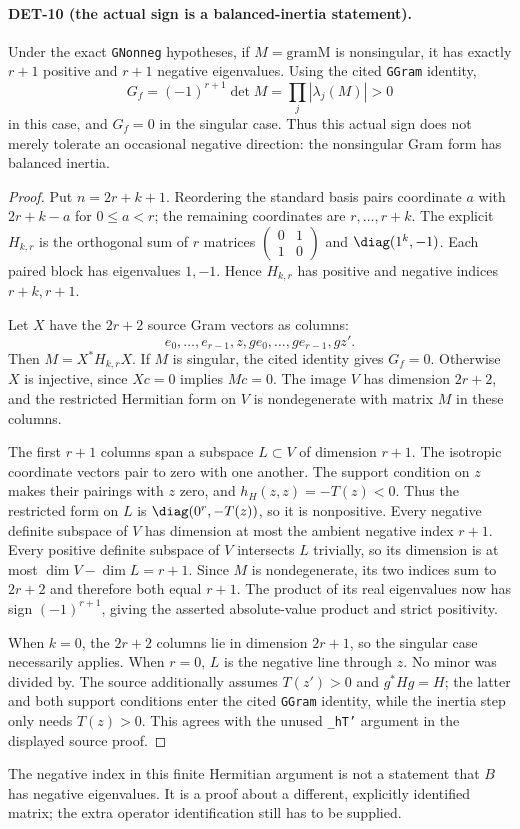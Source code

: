 \paragraph{DET-10 (the actual sign is a balanced-inertia statement).}
Under the exact \texttt{GNonneg} hypotheses, if $M=\mathrm{gramM}$ is nonsingular, it has exactly $r+1$ positive and $r+1$ negative eigenvalues. Using the cited \texttt{GGram} identity,
\[
 G_f=(-1)^{r+1}\det M=\prod_j|\lambda_j(M)|>0
\]
in this case, and $G_f=0$ in the singular case. Thus this actual sign does not merely tolerate an occasional negative direction: the nonsingular Gram form has balanced inertia.
\begin{proof}
Put $n=2r+k+1$. Reordering the standard basis pairs coordinate $a$ with $2r+k-a$ for $0\le a<r$; the remaining coordinates are $r,\ldots,r+k$. The explicit $H_{k,r}$ is the orthogonal sum of $r$ matrices $\left(\begin{smallmatrix}0&1\\1&0\end{smallmatrix}\right)$ and $\diag(1^k,-1)$. Each paired block has eigenvalues $1,-1$. Hence $H_{k,r}$ has positive and negative indices $r+k,r+1$.

Let $X$ have the $2r+2$ source Gram vectors as columns:
\[e_0,\ldots,e_{r-1},z,ge_0,\ldots,ge_{r-1},gz'.\]
Then $M=X^*H_{k,r}X$. If $M$ is singular, the cited identity gives $G_f=0$. Otherwise $X$ is injective, since $Xc=0$ implies $Mc=0$. The image $V$ has dimension $2r+2$, and the restricted Hermitian form on $V$ is nondegenerate with matrix $M$ in these columns.

The first $r+1$ columns span a subspace $L\subset V$ of dimension $r+1$. The isotropic coordinate vectors pair to zero with one another. The support condition on $z$ makes their pairings with $z$ zero, and $h_H(z,z)=-T(z)<0$. Thus the restricted form on $L$ is $\diag(0^r,-T(z))$, so it is nonpositive. Every negative definite subspace of $V$ has dimension at most the ambient negative index $r+1$. Every positive definite subspace of $V$ intersects $L$ trivially, so its dimension is at most $\dim V-\dim L=r+1$. Since $M$ is nondegenerate, its two indices sum to $2r+2$ and therefore both equal $r+1$. The product of its real eigenvalues now has sign $(-1)^{r+1}$, giving the asserted absolute-value product and strict positivity.

When $k=0$, the $2r+2$ columns lie in dimension $2r+1$, so the singular case necessarily applies. When $r=0$, $L$ is the negative line through $z$. No minor was divided by. The source additionally assumes $T(z')>0$ and $g^*Hg=H$; the latter and both support conditions enter the cited \texttt{GGram} identity, while the inertia step only needs $T(z)>0$. This agrees with the unused \texttt{\_hT'} argument in the displayed source proof.
\end{proof}
The negative index in this finite Hermitian argument is not a statement that $B$ has negative eigenvalues. It is a proof about a different, explicitly identified matrix; the extra operator identification still has to be supplied.

